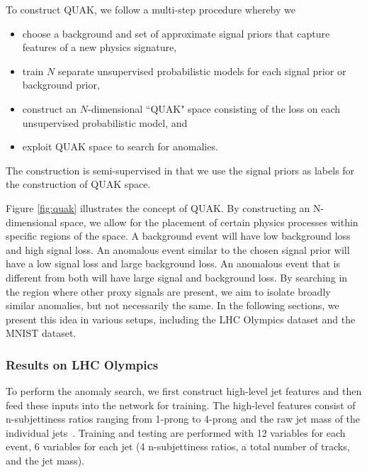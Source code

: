 \documentclass[a4paper,11pt]{article}
\begin{document}
To construct QUAK, we follow a multi-step procedure whereby we
\begin{itemize}
  \item choose a background and set of approximate signal priors that capture features of a new physics signature,
  \item train $N$ separate unsupervised probabilistic models for each signal prior or background prior,
  \item construct an $N$-dimensional ``QUAK" space consisting of the loss on each unsupervised probabilistic model, and
  \item exploit QUAK space to search for anomalies.
\end{itemize}
The construction is semi-supervised in that we use the signal priors as labels for the construction of QUAK space. 

Figure \ref{fig:quak} illustrates the concept of QUAK. By constructing an N-dimensional space, we allow for the placement of certain physics processes within specific regions of the space. A background event will have low background loss and high signal loss. An anomalous event similar to the chosen signal prior will have a low signal loss and large background loss. An anomalous event that is different from both will have large signal and background loss. By searching in the region where other proxy signals are present, we aim to isolate broadly similar anomalies, but not necessarily the same. In the following sections, we present this idea in various setups, including the LHC Olympics dataset and the MNIST dataset.
























 
\subsubsection{Results on LHC Olympics}
\label{sec:results}




To perform the anomaly search, we first construct high-level jet features and then feed these inputs into the network for training. The high-level features consist of n-subjettiness ratios ranging from 1-prong to 4-prong and the raw jet mass of the individual jets~\cite{Thaler:2010tr,Datta:2017rhs}. Training and testing are performed with 12 variables for each event, 6 variables for each jet (4 n-subjettiness ratios, a total number of tracks, and the jet mass). 
\end{document}
